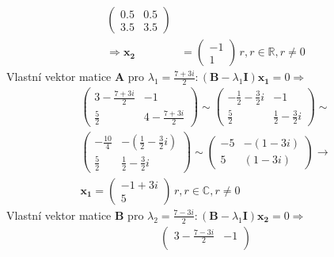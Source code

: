 \begin{example}
\begin{align*}
\begin{pmatrix}
       0.5  &  0.5       \\
       3.5  &  3.5
    \end{pmatrix}        \\
    \Rightarrow\mathbf{x_2} &=
    \begin{pmatrix}
      -1 \\ 1
    \end{pmatrix}
    \, r, r\in\mathbb{R}, r\neq0
  \end{align*}
  Vlastní vektor matice \(\mathbf{A}\) pro \(\lambda_1=\frac{7+3i}{2}: (\mathbf{B} - 
  \lambda_1\mathbf{I})\mathbf{x_1}=0 \Rightarrow\)
  \begin{align*}
    \begin{pmatrix}
       3 - \frac{7+3i}{2}            & -1                                     \\
       \frac{5}{2}                   &  4 - \frac{7+3i}{2}
    \end{pmatrix}
    \sim
    \begin{pmatrix}
      -\frac{1}{2}-\frac{3}{2}i      &  -1                                     \\
      \frac{5}{2}                    & \frac{1}{2}-\frac{3}{2}i
    \end{pmatrix}
    \sim \\
    \begin{pmatrix}
      -\frac{10}{4}                  &-\left(\frac{1}{2} -\frac{3}{2}i\right)  \\
      \frac{5}{2}                    & \frac{1}{2}-\frac{3}{2}i
    \end{pmatrix}
    \sim
    \begin{pmatrix}
      -5                           &-\left(1-3i\right)                         \\
       5                           & \left(1-3i\right)
    \end{pmatrix}
    \rightarrow \\
    \mathbf{x_1}=
    \begin{pmatrix}
      -1+3i \\ 5
    \end{pmatrix}
    \, r, r\in\mathbb{C}, r\neq0
  \end{align*}
  Vlastní vektor matice \(\mathbf{B}\) pro \(\lambda_2=\frac{7-3i}{2}: (\mathbf{B} - 
  \lambda_1\mathbf{I})\mathbf{x_2}=0 \Rightarrow\)
  \begin{align*}
    \begin{pmatrix}
       3  - \frac{7-3i}{2}       &  -1                                     \\

\end{pmatrix}
\end{align*}
\end{example}
